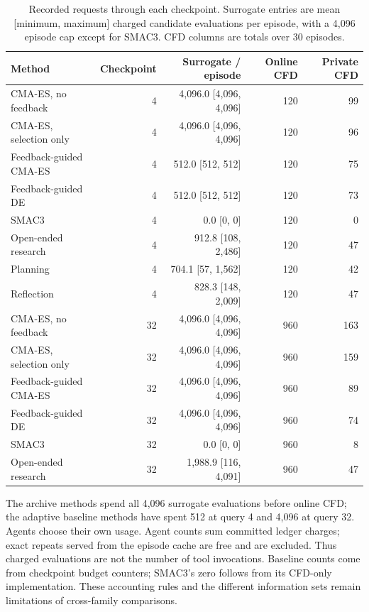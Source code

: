 \begin{table}[htbp]\centering\scriptsize
\caption{Recorded requests through each checkpoint. Surrogate entries are mean [minimum, maximum] charged candidate evaluations per episode, with a 4,096 episode cap except for SMAC3. CFD columns are totals over 30 episodes.}
\label{tab:resource-queries}
\setlength{\tabcolsep}{3pt}
\begin{tabular*}{\textwidth}{@{\extracolsep{\fill}}lrrrr}\toprule
Method & Checkpoint & Surrogate / episode & Online CFD & Private CFD \\ \midrule
CMA-ES, no feedback & 4 & 4{,}096.0 [4{,}096, 4{,}096] & 120 & 99 \\
CMA-ES, selection only & 4 & 4{,}096.0 [4{,}096, 4{,}096] & 120 & 96 \\
Feedback-guided CMA-ES & 4 & 512.0 [512, 512] & 120 & 75 \\
Feedback-guided DE & 4 & 512.0 [512, 512] & 120 & 73 \\
SMAC3 & 4 & 0.0 [0, 0] & 120 & 0 \\
Open-ended research & 4 & 912.8 [108, 2{,}486] & 120 & 47 \\
Planning & 4 & 704.1 [57, 1{,}562] & 120 & 42 \\
Reflection & 4 & 828.3 [148, 2{,}009] & 120 & 47 \\
\midrule
CMA-ES, no feedback & 32 & 4{,}096.0 [4{,}096, 4{,}096] & 960 & 163 \\
CMA-ES, selection only & 32 & 4{,}096.0 [4{,}096, 4{,}096] & 960 & 159 \\
Feedback-guided CMA-ES & 32 & 4{,}096.0 [4{,}096, 4{,}096] & 960 & 89 \\
Feedback-guided DE & 32 & 4{,}096.0 [4{,}096, 4{,}096] & 960 & 74 \\
SMAC3 & 32 & 0.0 [0, 0] & 960 & 8 \\
Open-ended research & 32 & 1{,}988.9 [116, 4{,}091] & 960 & 47 \\
\bottomrule\end{tabular*}\end{table}

The archive methods spend all 4,096 surrogate evaluations before online CFD; the adaptive baseline methods have spent 512 at query 4 and 4,096 at query 32. Agents choose their own usage. Agent counts sum committed ledger charges; exact repeats served from the episode cache are free and are excluded. Thus charged evaluations are not the number of tool invocations. Baseline counts come from checkpoint budget counters; SMAC3's zero follows from its CFD-only implementation. These accounting rules and the different information sets remain limitations of cross-family comparisons.

